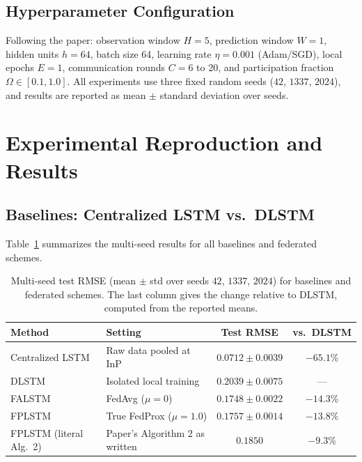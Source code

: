 \documentclass[11pt,a4paper]{article}
\begin{document}
\subsection{Hyperparameter Configuration}
Following the paper: observation window $H = 5$, prediction window $W = 1$, hidden units $h = 64$, batch size 64, learning rate $\eta = 0.001$ (Adam/SGD), local epochs $E = 1$, communication rounds $C = 6$ to $20$, and participation fraction $\Omega \in [0.1, 1.0]$. All experiments use three fixed random seeds ($42$, $1337$, $2024$), and results are reported as mean $\pm$ standard deviation over seeds.

\section{Experimental Reproduction and Results}

\subsection{Baselines: Centralized LSTM vs.\ DLSTM}
Table~\ref{tab:fl_reproduction} summarizes the multi-seed results for all baselines and federated schemes.

\begin{table}[htbp]
\centering
\caption{Multi-seed test RMSE (mean $\pm$ std over seeds $42$, $1337$, $2024$) for baselines and federated schemes. The last column gives the change relative to DLSTM, computed from the reported means.}
\label{tab:fl_reproduction}
\small
\begin{tabular}{@{}llcc@{}}
\toprule
\textbf{Method} & \textbf{Setting} & \textbf{Test RMSE} & \textbf{vs.\ DLSTM} \\
\midrule
Centralized LSTM          & Raw data pooled at InP      & $0.0712 \pm 0.0039$ & $-65.1\%$ \\
DLSTM                     & Isolated local training     & $0.2039 \pm 0.0075$ & --- \\
FALSTM                    & FedAvg ($\mu = 0$)          & $0.1748 \pm 0.0022$ & $-14.3\%$ \\
FPLSTM                    & True FedProx ($\mu = 1.0$)  & $0.1757 \pm 0.0014$ & $-13.8\%$ \\
FPLSTM (literal Alg.~2)   & Paper's Algorithm 2 as written & $0.1850$         & $-9.3\%$ \\
\bottomrule
\end{tabular}
\end{table}
\end{document}
